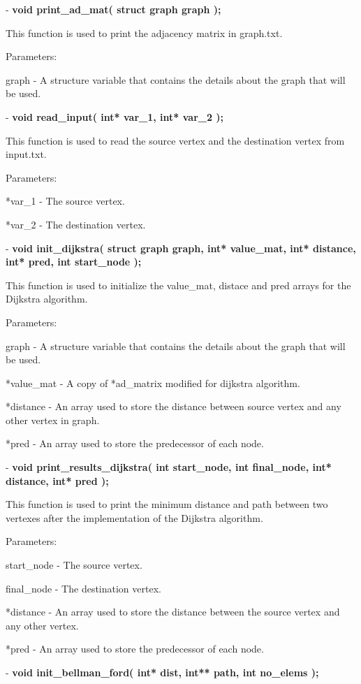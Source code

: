 \documentclass[12]{article}
\begin{document}
- \textbf{void print\_ad\_mat( struct graph graph );}

This function is used to print the adjacency matrix in graph.txt.

    Parameters:
    
    graph - A structure variable that contains the details about the graph that will be used.

- \textbf{void read\_input( int* var\_1, int* var\_2 );}

This function is used to read the source vertex and the destination vertex from input.txt.

Parameters:

        *var\_1 - The source vertex.
        
		*var\_2 - The destination vertex.
		
- \textbf{void init\_dijkstra( struct graph graph, int* value\_mat, int* distance, int* pred, int start\_node );}

This function is used to initialize the value\_mat, distace and pred arrays for the Dijkstra algorithm.


Parameters:
        
        graph - A structure variable that contains the details about the graph that will be used.
        
        *value\_mat - A copy of *ad\_matrix modified for dijkstra algorithm.
        
	    *distance - An array used to store the distance between source vertex and any other vertex in graph.
	    
    	*pred - An array used to store the predecessor of each node.
    	
- \textbf{void print\_results\_dijkstra( int start\_node, int final\_node, int* distance, int* pred );}

This function is used to print the minimum distance and path between two vertexes after the implementation of the Dijkstra algorithm.

Parameters:

start\_node - The source vertex.

 final\_node - The destination vertex.
 
	*distance - An array used to store the distance between the source vertex and any other vertex.
	
*pred - An array used to store the predecessor of each node.
    

- \textbf{void init\_bellman\_ford( int* dist, int** path, int no\_elems );}
\end{document}
